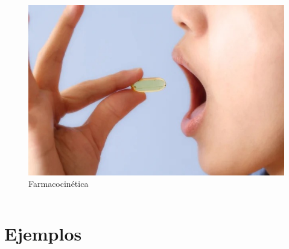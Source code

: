 \documentclass[
  10pt,
  ignorenonframetext,
  aspectratio=169,
]{beamer}
\begin{document}
\begin{frame}
\begin{columns}[T]
\begin{column}{0.48\textwidth}
\begin{figure}
\centering
\includegraphics[width=\textwidth,height=0.35\textheight]{./images/pastilla.jpg}
\caption{Farmacocinética}
\end{figure}
\end{column}
\end{columns}
\end{frame}

\section{Ejemplos}\label{ejemplos}
\end{document}
